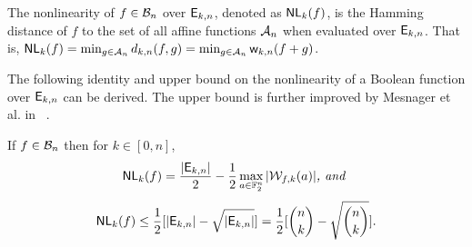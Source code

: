 \documentclass{llncs}
\begin{document}
\begin{definition}\label{def:wtNl}
The nonlinearity of $f \in \mathcal{B}_n$ over $\mathsf{E}_{k,n}$, denoted as $\mathsf{NL}_{k}(f)$, is the Hamming distance of $f$ to the set of all affine functions $\mathcal{A}_n$ when evaluated over $\mathsf{E}_{k,n}$. 
That is, $\mathsf{NL}_{k}(f) = \min_{g \in \mathcal{A}_n} d_{k,n}(f,g) = \min_{g \in \mathcal{A}_n} \mathsf{w}_{k,n}(f+g)$.\\
\end{definition}

The following identity and upper bound on the nonlinearity of a Boolean function over $\mathsf{E}_{k,n}$ can be derived. The upper bound is further improved by Mesnager et al. in ~\cite{CC:MesZhoDin19}.
\begin{lemma}\label{lem:wnl}
If $f \in \mathcal{B}_n$ then for $k \in [0,n]$, 
\[\mathsf{NL}_{k}(f) = \frac{|\mathsf{E}_{k,n}|}{2}- \frac{1}{2}\max_{a \in \mathbb{F}_2^n} |\mathcal{W}_{f,k}(a)| \textit{, and } \]
\[\mathsf{NL}_{k}(f) \leq \frac{1}{2} [|\mathsf{E}_{k,n}| - \sqrt{|\mathsf{E}_{k,n}|}] = \frac{1}{2} [{n \choose k} - \sqrt{{n \choose k}}].\]
\end{lemma}


\end{document}

